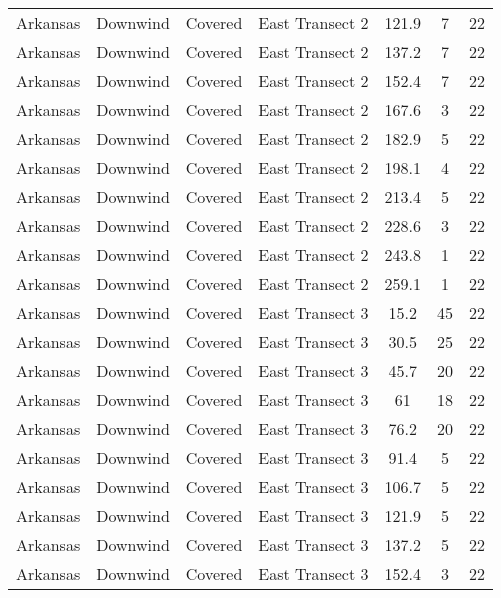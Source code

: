 \documentclass{article}
\begin{document}
\begin{longtable}[c]{ccccccc}
Arkansas  & Downwind  & Covered     & East Transect 2 & 121.9        & 7           & 22  \\
Arkansas  & Downwind  & Covered     & East Transect 2 & 137.2        & 7           & 22  \\
Arkansas  & Downwind  & Covered     & East Transect 2 & 152.4        & 7           & 22  \\
Arkansas  & Downwind  & Covered     & East Transect 2 & 167.6        & 3           & 22  \\
Arkansas  & Downwind  & Covered     & East Transect 2 & 182.9        & 5           & 22  \\
Arkansas  & Downwind  & Covered     & East Transect 2 & 198.1        & 4           & 22  \\
Arkansas  & Downwind  & Covered     & East Transect 2 & 213.4        & 5           & 22  \\
Arkansas  & Downwind  & Covered     & East Transect 2 & 228.6        & 3           & 22  \\
Arkansas  & Downwind  & Covered     & East Transect 2 & 243.8        & 1           & 22  \\
Arkansas  & Downwind  & Covered     & East Transect 2 & 259.1        & 1           & 22  \\
Arkansas  & Downwind  & Covered     & East Transect 3 & 15.2         & 45          & 22  \\
Arkansas  & Downwind  & Covered     & East Transect 3 & 30.5         & 25          & 22  \\
Arkansas  & Downwind  & Covered     & East Transect 3 & 45.7         & 20          & 22  \\
Arkansas  & Downwind  & Covered     & East Transect 3 & 61           & 18          & 22  \\
Arkansas  & Downwind  & Covered     & East Transect 3 & 76.2         & 20          & 22  \\
Arkansas  & Downwind  & Covered     & East Transect 3 & 91.4         & 5           & 22  \\
Arkansas  & Downwind  & Covered     & East Transect 3 & 106.7        & 5           & 22  \\
Arkansas  & Downwind  & Covered     & East Transect 3 & 121.9        & 5           & 22  \\
Arkansas  & Downwind  & Covered     & East Transect 3 & 137.2        & 5           & 22  \\
Arkansas  & Downwind  & Covered     & East Transect 3 & 152.4        & 3           & 22  \\

\end{longtable}
\end{document}

